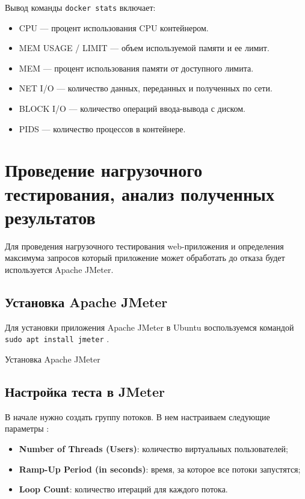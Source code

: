 Вывод команды \texttt{docker stats} включает:

\begin{itemize}
	\item CPU --- процент использования CPU контейнером.
	\item MEM USAGE / LIMIT --- объем используемой памяти и ее лимит.
	\item MEM --- процент использования памяти от доступного лимита.
	\item NET I/O --- количество данных, переданных и полученных по сети.
	\item BLOCK I/O --- количество операций ввода-вывода с диском.
	\item PIDS --- количество процессов в контейнере.
\end{itemize}

\section{Проведение нагрузочного тестирования, анализ полученных результатов}

Для проведения нагрузочного тестирования web-приложения
и определения максимума запросов который приложение может обработать до отказа
будет используется Apache JMeter.

\subsection{Установка Apache JMeter}

Для установки приложения Apache JMeter в Ubuntu воспользуемся командой
\texttt{sudo apt install jmeter} .

\begin{image}
    \caption{Установка Apache JMeter}
    \label{fig:jmeter:install}
\end{image}

\subsection{Настройка теста в JMeter}

В начале нужно создать группу потоков.
В нем настраиваем следующие параметры :

\begin{itemize}
	\item \textbf{Number of Threads (Users)}:
		количество виртуальных пользователей;
	\item \textbf{Ramp-Up Period (in seconds)}: время,
		за которое все потоки запустятся;
	\item \textbf{Loop Count}: количество итераций для каждого потока.
\end{itemize}

